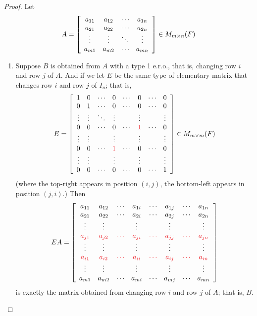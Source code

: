 \begin{proof}
Let
\[
    A=\left[\begin{array}{cccc}
        a_{11} & a_{12} & \cdots & a_{1 n} \\
        a_{21} & a_{22} & \cdots & a_{2 n} \\
        \vdots & \vdots & \ddots & \vdots \\
        a_{m 1} & a_{m 2} & \cdots & a_{m n}
    \end{array}\right] \in M_{m \times n}(F)
\]

\begin{enumerate}
\item 
Suppose \(B\) is obtained from \(A\) with a type 1 e.r.o., that is, changing row \(i\) and row \(j\) of \(A\).
And if we let \(E\) be the same type of elementary matrix that changes row \(i\) and row \(j\) of \(I_n\);
that is,
\[
    E=\left[\begin{array}{cccccccc}
        1 & 0 & \cdots & 0 & \cdots & 0 & \cdots & 0 \\
        0 & 1 & \cdots & 0 & \cdots & 0 & \cdots & 0 \\
        \vdots & \vdots & \ddots & \vdots & & \vdots & & \vdots \\
        0 & 0 & \cdots & 0 & \cdots & \RED{1} & \cdots & 0 \\
        \vdots & \vdots & & \vdots & & \vdots & & \vdots \\
        0 & 0 & \cdots & \RED{1} & \cdots & 0 & \cdots & 0 \\
        \vdots & \vdots & & \vdots & & \vdots & & \vdots \\
        0 & 0 & \cdots & 0 & \cdots & 0 & \cdots & 1
    \end{array}\right] \in M_{m \X m}(F)
\]
(where the top-right  appears in position \((i, j)\), the bottom-left  appears in position \((j, i)\).)
Then
\[
    E A=\left[\begin{array}{cccccccc}
        a_{11} & a_{12} & \cdots & a_{1 i} & \cdots & a_{1 j} & \cdots & a_{1 n} \\
        a_{21} & a_{22} & \cdots & a_{2 i} & \cdots & a_{2 j} & \cdots & a_{2 n} \\
        \vdots & \vdots & & \vdots & & \vdots & & \vdots \\
        \RED{a_{j 1}} & \RED{a_{j 2}} & \RED{\cdots} & \RED{a_{j i}} & \RED{\cdots} & \RED{a_{j j}} & \RED{\cdots} & \RED{a_{j n}} \\
        \vdots & \vdots & & \vdots & & \vdots & & \vdots \\
        \RED{a_{i 1}} & \RED{a_{i 2}} & \RED{\cdots} & \RED{a_{i i}} & \RED{\cdots} & \RED{a_{i j}} & \RED{\cdots} & \RED{a_{i n}} \\
        \vdots & \vdots & & \vdots & & \vdots & & \vdots \\
        a_{m 1} & a_{m 2} & \cdots & a_{m i} & \cdots & a_{m j} & \cdots & a_{m n}
    \end{array}\right]
\]
is exactly the matrix obtained from changing row \(i\) and row \(j\) of \(A\); that is, \(B\).


\end{enumerate}
\end{proof}
